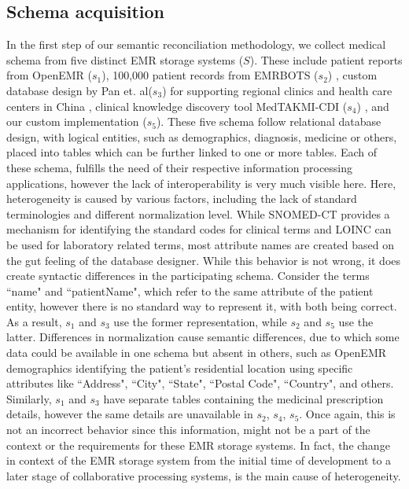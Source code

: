 \subsection*{Schema acquisition}
\label{schema_acq}
In the first step of our semantic reconciliation methodology, we collect medical schema from five distinct EMR storage systems ($S$). These include patient reports from OpenEMR ($s_1$), 100,000 patient records from EMRBOTS ($s_2$) \cite{kartoun2016methodology}, custom database design by Pan et. al($s_3$) for supporting regional clinics and health care centers in China \cite{pan2016design}, clinical knowledge discovery tool MedTAKMI-CDI ($s_4$) \cite{inokuchi2007medtakmi}, and our custom implementation ($s_5$). These five schema follow relational database design, with logical entities, such as demographics, diagnosis, medicine or others, placed into tables which can be further linked to one or more tables. Each of these schema, fulfills the need of their respective information processing applications, however the lack of interoperability is very much visible here. Here, heterogeneity is caused by various factors, including the lack of standard terminologies and different normalization level.
While SNOMED-CT provides a mechanism for identifying the standard codes for clinical terms and LOINC can be used for laboratory related terms, most attribute names are created based on the gut feeling of the database designer. While this behavior is not wrong, it does create syntactic differences in the participating schema. Consider the terms ``name" and ``patientName", which refer to the same attribute of the patient entity, however there is no standard way to represent it, with both being correct. As a result, $s_1$ and $s_3$ use the former representation, while $s_2$ and $s_5$ use the latter. 
Differences in normalization cause semantic differences, due to which some data could be available in one schema but absent in others, such as OpenEMR demographics identifying the patient's residential location using specific attributes like ``Address", ``City", ``State", ``Postal Code", ``Country", and others. Similarly, $s_1$ and $s_3$ have separate tables containing the medicinal prescription details, however the same details are unavailable in $s_2$, $s_4$, $s_5$. Once again, this is not an incorrect behavior since this information, might not be a part of the context or the requirements for these EMR storage systems.
In fact, the change in context of the EMR storage system from the initial time of development to a later stage of collaborative processing systems, is the main cause of heterogeneity.




